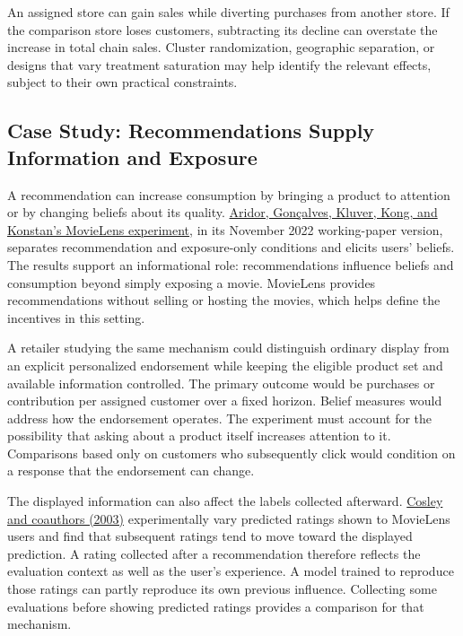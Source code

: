 An assigned store can gain sales while diverting purchases from another
store. If the comparison store loses customers, subtracting its decline
can overstate the increase in total chain sales. Cluster randomization,
geographic separation, or designs that vary treatment saturation may
help identify the relevant effects, subject to their own practical
constraints.

\hypertarget{M06-case-study-recommendations-supply-information-and-exposure}{%
\subsection{Case Study: Recommendations Supply Information and
Exposure}\label{M06-case-study-recommendations-supply-information-and-exposure}}

\noindent A recommendation can increase consumption by bringing a product to
attention or by changing beliefs about its quality.
\href{https://www.econstor.eu/handle/10419/271773}{Aridor, Gonçalves,
Kluver, Kong, and Konstan's MovieLens experiment}, in its November 2022
working-paper version, separates recommendation and exposure-only
conditions and elicits users' beliefs. The results support an
informational role: recommendations influence beliefs and consumption
beyond simply exposing a movie. MovieLens provides recommendations
without selling or hosting the movies, which helps define the incentives
in this setting.

A retailer studying the same mechanism could distinguish ordinary
display from an explicit personalized endorsement while keeping the
eligible product set and available information controlled. The primary
outcome would be purchases or contribution per assigned customer over a
fixed horizon. Belief measures would address how the endorsement
operates. The experiment must account for the possibility that asking
about a product itself increases attention to it. Comparisons based only
on customers who subsequently click would condition on a response that
the endorsement can change.

The displayed information can also affect the labels collected
afterward.
\href{https://experts.umn.edu/en/publications/is-seeing-believing-how-recommender-interfaces-affect-users-opini/}{Cosley
and coauthors (2003)} experimentally vary predicted ratings shown to
MovieLens users and find that subsequent ratings tend to move toward the
displayed prediction. A rating collected after a recommendation
therefore reflects the evaluation context as well as the user's
experience. A model trained to reproduce those ratings can partly
reproduce its own previous influence. Collecting some evaluations before
showing predicted ratings provides a comparison for that mechanism.

